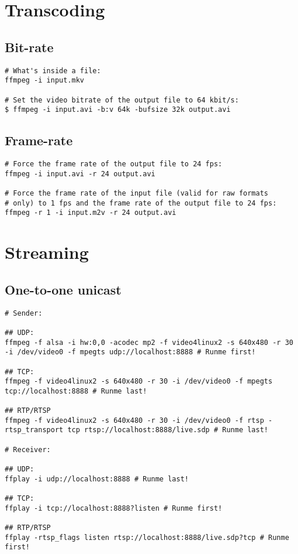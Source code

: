 

\chapter{Transcoding}

\section{Bit-rate}

\begin{verbatim}
# What's inside a file:
ffmpeg -i input.mkv

# Set the video bitrate of the output file to 64 kbit/s:
$ ffmpeg -i input.avi -b:v 64k -bufsize 32k output.avi
\end{verbatim}


\section{Frame-rate}

\begin{verbatim}
# Force the frame rate of the output file to 24 fps:
ffmpeg -i input.avi -r 24 output.avi

# Force the frame rate of the input file (valid for raw formats
# only) to 1 fps and the frame rate of the output file to 24 fps:
ffmpeg -r 1 -i input.m2v -r 24 output.avi
\end{verbatim}



\chapter{Streaming} %

\section{One-to-one unicast}

\begin{verbatim}
# Sender:

## UDP:
ffmpeg -f alsa -i hw:0,0 -acodec mp2 -f video4linux2 -s 640x480 -r 30 -i /dev/video0 -f mpegts udp://localhost:8888 # Runme first!

## TCP:
ffmpeg -f video4linux2 -s 640x480 -r 30 -i /dev/video0 -f mpegts tcp://localhost:8888 # Runme last!

## RTP/RTSP
ffmpeg -f video4linux2 -s 640x480 -r 30 -i /dev/video0 -f rtsp -rtsp_transport tcp rtsp://localhost:8888/live.sdp # Runme last!

# Receiver:

## UDP:
ffplay -i udp://localhost:8888 # Runme last!

## TCP:
ffplay -i tcp://localhost:8888?listen # Runme first!

## RTP/RTSP
ffplay -rtsp_flags listen rtsp://localhost:8888/live.sdp?tcp # Runme first!
\end{verbatim}

